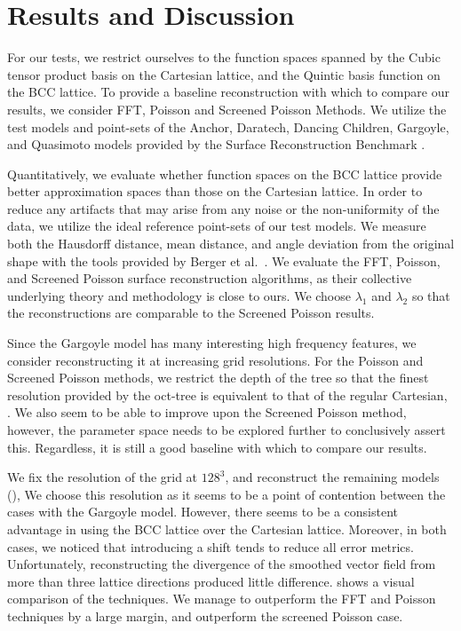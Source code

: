 \section{Results and Discussion}
For our tests, we restrict ourselves to the function spaces spanned by the Cubic tensor product basis on the Cartesian lattice, and the Quintic basis function on the BCC lattice. 
To provide a baseline reconstruction with which to compare our results, we consider FFT, Poisson and Screened Poisson Methods. 
We utilize the test models and point-sets of the Anchor, Daratech, Dancing Children, Gargoyle, and Quasimoto models provided by the Surface Reconstruction Benchmark \cite{reconbench}.

Quantitatively, we evaluate whether function spaces on the BCC lattice provide better approximation spaces than those on the Cartesian lattice. In order to reduce any artifacts that may arise from any noise or the non-uniformity of the data, we utilize the ideal reference point-sets of our test models.  
We measure both the Hausdorff distance, mean distance, and angle deviation from the original shape with the tools provided by Berger et al.~\cite{reconbench}. 
We evaluate the FFT, Poisson, and Screened Poisson surface reconstruction algorithms, as their collective underlying theory and methodology is close to ours. 
We choose $\lambda_1$ and $\lambda_2$ so that the reconstructions are comparable to the Screened Poisson results.

Since the Gargoyle model has many interesting high frequency features, we consider reconstructing it at increasing grid resolutions. 
For the Poisson and Screened Poisson methods, we restrict the depth of the tree so that the finest resolution provided by the oct-tree is equivalent to that of the regular Cartesian, . 
We also seem to be able to improve upon the Screened Poisson method, however, the parameter space needs to be explored further to conclusively assert this. 
Regardless, it is still a good baseline with which to compare our results. 

We fix the resolution of the grid at $128^3$, and reconstruct the remaining models (), 
We choose this resolution as it seems to be a point of contention between the cases with the Gargoyle model.
However, there seems to be a consistent advantage in using the BCC lattice over the Cartesian lattice. 
Moreover, in both cases, we noticed that introducing a shift tends to reduce all error metrics. 
Unfortunately, reconstructing the divergence of the smoothed vector field from more than three lattice directions produced little difference. 
 shows a visual comparison of the techniques. 
We manage to outperform the FFT and Poisson techniques by a large margin, and outperform the screened Poisson case.

